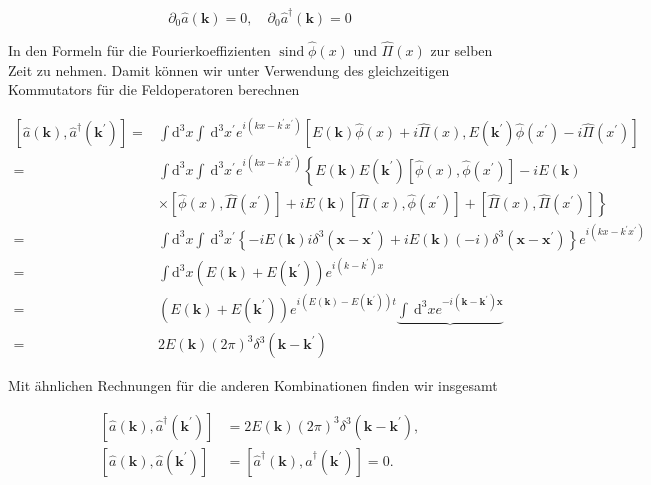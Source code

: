 \documentclass[10pt, letterpaper]{article}
\begin{document}
$$
\partial_{0} \hat{a}(\mathbf{k})=0, \quad \partial_{0} \hat{a}^{\dagger}(\mathbf{k})=0
$$

In den Formeln für die Fourierkoeffizienten $\operatorname{sind} \hat{\phi}(x)$ und $\hat{\Pi}(x)$ zur selben Zeit zu nehmen. Damit können wir unter Verwendung des gleichzeitigen Kommutators für die Feldoperatoren berechnen

$$
\begin{aligned}
{\left[\hat{a}(\mathbf{k}), \hat{a}^{\dagger}\left(\mathbf{k}^{\prime}\right)\right]=} & \int \mathrm{d}^{3} x \int \mathrm{~d}^{3} x^{\prime} e^{i\left(k x-k^{\prime} x^{\prime}\right)}\left[E(\mathbf{k}) \hat{\phi}(x)+i \hat{\Pi}(x), E\left(\mathbf{k}^{\prime}\right) \hat{\phi}\left(x^{\prime}\right)-i \hat{\Pi}\left(x^{\prime}\right)\right] \\
= & \int \mathrm{d}^{3} x \int \mathrm{~d}^{3} x^{\prime} e^{i\left(k x-k^{\prime} x^{\prime}\right)}\left\{E(\mathbf{k}) E\left(\mathbf{k}^{\prime}\right)\left[\hat{\phi}(x), \hat{\phi}\left(x^{\prime}\right)\right]-i E(\mathbf{k})\right. \\
& \left.\times\left[\hat{\phi}(x), \hat{\Pi}\left(x^{\prime}\right)\right]+i E(\mathbf{k})\left[\hat{\Pi}(x), \hat{\phi}\left(x^{\prime}\right)\right]+\left[\hat{\Pi}(x), \hat{\Pi}\left(x^{\prime}\right)\right]\right\} \\
= & \int \mathrm{d}^{3} x \int \mathrm{~d}^{3} x^{\prime}\left\{-i E(\mathbf{k}) i \delta^{3}\left(\mathbf{x}-\mathbf{x}^{\prime}\right)+i E(\mathbf{k})(-i) \delta^{3}\left(\mathbf{x}-\mathbf{x}^{\prime}\right)\right\} e^{i\left(k x-k^{\prime} x^{\prime}\right)} \\
= & \int \mathrm{d}^{3} x\left(E(\mathbf{k})+E\left(\mathbf{k}^{\prime}\right)\right) e^{i\left(k-k^{\prime}\right) x} \\
= & \left(E(\mathbf{k})+E\left(\mathbf{k}^{\prime}\right)\right) e^{i\left(E(\mathbf{k})-E\left(\mathbf{k}^{\prime}\right)\right) t} \underbrace{\int \mathrm{~d}^{3} x e^{-i\left(\mathbf{k}-\mathbf{k}^{\prime}\right) \mathbf{x}}} \\
= & 2 E(\mathbf{k})(2 \pi)^{3} \delta^{3}\left(\mathbf{k}-\mathbf{k}^{\prime}\right)
\end{aligned}
$$

Mit ähnlichen Rechnungen für die anderen Kombinationen finden wir insgesamt

$$
\begin{aligned}
{\left[\hat{a}(\mathbf{k}), \hat{a}^{\dagger}\left(\mathbf{k}^{\prime}\right)\right] } & =2 E(\mathbf{k})(2 \pi)^{3} \delta^{3}\left(\mathbf{k}-\mathbf{k}^{\prime}\right), \\
{\left[\hat{a}(\mathbf{k}), \hat{a}\left(\mathbf{k}^{\prime}\right)\right] } & =\left[\hat{a}^{\dagger}(\mathbf{k}), \hat{a}^{\dagger}\left(\mathbf{k}^{\prime}\right)\right]=0 .
\end{aligned}
$$
\end{document}
